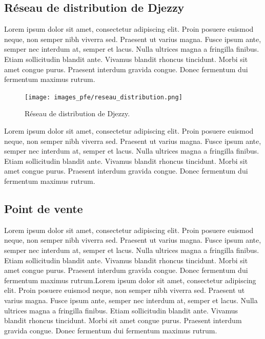 \subsection{Réseau de distribution de Djezzy}

Lorem ipsum dolor sit amet, consectetur adipiscing elit. Proin posuere euismod neque, non semper nibh viverra sed. Praesent ut varius magna. Fusce ipsum ante, semper nec interdum at, semper et lacus. Nulla ultrices magna a fringilla finibus. Etiam sollicitudin blandit ante. Vivamus blandit rhoncus tincidunt. Morbi sit amet congue purus. Praesent interdum gravida congue. Donec fermentum dui fermentum maximus rutrum.

\medskip

\begin{figure}[hbt!]
  \centering
  \texttt{[image: images\_pfe/reseau\_distribution.png]}
  \caption{Réseau de distribution de Djezzy.}
  \label{fig:reseau-distribution}
\end{figure}
\FloatBarrier

Lorem ipsum dolor sit amet, consectetur adipiscing elit. Proin posuere euismod neque, non semper nibh viverra sed. Praesent ut varius magna. Fusce ipsum ante, semper nec interdum at, semper et lacus. Nulla ultrices magna a fringilla finibus. Etiam sollicitudin blandit ante. Vivamus blandit rhoncus tincidunt. Morbi sit amet congue purus. Praesent interdum gravida congue. Donec fermentum dui fermentum maximus rutrum.

\medskip

\subsection{Point de vente}
\label{sec:pos}

Lorem ipsum dolor sit amet, consectetur adipiscing elit. Proin posuere euismod neque, non semper nibh viverra sed. Praesent ut varius magna. Fusce ipsum ante, semper nec interdum at, semper et lacus. Nulla ultrices magna a fringilla finibus. Etiam sollicitudin blandit ante. Vivamus blandit rhoncus tincidunt. Morbi sit amet congue purus. Praesent interdum gravida congue. Donec fermentum dui fermentum maximus rutrum.Lorem ipsum dolor sit amet, consectetur adipiscing elit. Proin posuere euismod neque, non semper nibh viverra sed. Praesent ut varius magna. Fusce ipsum ante, semper nec interdum at, semper et lacus. Nulla ultrices magna a fringilla finibus. Etiam sollicitudin blandit ante. Vivamus blandit rhoncus tincidunt. Morbi sit amet congue purus. Praesent interdum gravida congue. Donec fermentum dui fermentum maximus rutrum.

